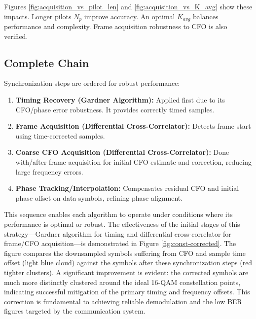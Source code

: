 \documentclass[11pt]{article}
\begin{document}
	Figures \ref{fig:acquisition_vs_pilot_len} and \ref{fig:acquisition_vs_K_avg} show these impacts. Longer pilots $N_p$ improve accuracy. An optimal $K_{avg}$ balances performance and complexity. Frame acquisition robustness to CFO is also verified.
	

	\subsection{Complete Chain}
	Synchronization steps are ordered for robust performance:
	\begin{enumerate}
		\item \textbf{Timing Recovery (Gardner Algorithm):} Applied first due to its CFO/phase error robustness. It provides correctly timed samples.
		\item \textbf{Frame Acquisition (Differential Cross-Correlator):} Detects frame start using time-corrected samples.
		\item \textbf{Coarse CFO Acquisition (Differential Cross-Correlator):} Done with/after frame acquisition for initial CFO estimate and correction, reducing large frequency errors.
		\item \textbf{Phase Tracking/Interpolation:} Compensates residual CFO and initial phase offset on data symbols, refining phase alignment.
	\end{enumerate}
	This sequence enables each algorithm to operate under conditions where its performance is optimal or robust. The effectiveness of the initial stages of this strategy—Gardner algorithm for timing and differential cross-correlator for frame/CFO acquisition—is demonstrated in Figure \ref{fig:const-corrected}. The figure compares the downsampled symbols suffering from CFO and sample time offset (light blue cloud) against the symbols after these synchronization steps (red tighter clusters). A significant improvement is evident: the corrected symbols are much more distinctly clustered around the ideal 16-QAM constellation points, indicating successful mitigation of the primary timing and frequency offsets. This correction is fundamental to achieving reliable demodulation and the low BER figures targeted by the communication system.
	
\end{document}
